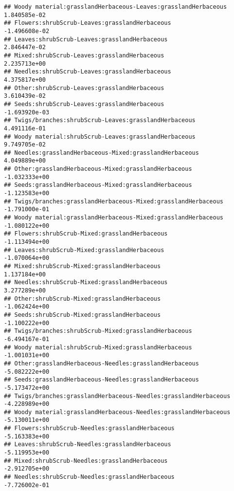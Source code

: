 \documentclass[
]{article}
\begin{document}
\begin{verbatim}
## Woody material:grasslandHerbaceous-Leaves:grasslandHerbaceous          1.840585e-02
## Flowers:shrubScrub-Leaves:grasslandHerbaceous                         -1.496608e-02
## Leaves:shrubScrub-Leaves:grasslandHerbaceous                           2.846447e-02
## Mixed:shrubScrub-Leaves:grasslandHerbaceous                            2.235713e+00
## Needles:shrubScrub-Leaves:grasslandHerbaceous                          4.375817e+00
## Other:shrubScrub-Leaves:grasslandHerbaceous                            3.610439e-02
## Seeds:shrubScrub-Leaves:grasslandHerbaceous                           -1.693920e-03
## Twigs/branches:shrubScrub-Leaves:grasslandHerbaceous                   4.491116e-01
## Woody material:shrubScrub-Leaves:grasslandHerbaceous                   9.749705e-02
## Needles:grasslandHerbaceous-Mixed:grasslandHerbaceous                  4.049889e+00
## Other:grasslandHerbaceous-Mixed:grasslandHerbaceous                   -1.032333e+00
## Seeds:grasslandHerbaceous-Mixed:grasslandHerbaceous                   -1.123583e+00
## Twigs/branches:grasslandHerbaceous-Mixed:grasslandHerbaceous          -1.791000e-01
## Woody material:grasslandHerbaceous-Mixed:grasslandHerbaceous          -1.080122e+00
## Flowers:shrubScrub-Mixed:grasslandHerbaceous                          -1.113494e+00
## Leaves:shrubScrub-Mixed:grasslandHerbaceous                           -1.070064e+00
## Mixed:shrubScrub-Mixed:grasslandHerbaceous                             1.137184e+00
## Needles:shrubScrub-Mixed:grasslandHerbaceous                           3.277289e+00
## Other:shrubScrub-Mixed:grasslandHerbaceous                            -1.062424e+00
## Seeds:shrubScrub-Mixed:grasslandHerbaceous                            -1.100222e+00
## Twigs/branches:shrubScrub-Mixed:grasslandHerbaceous                   -6.494167e-01
## Woody material:shrubScrub-Mixed:grasslandHerbaceous                   -1.001031e+00
## Other:grasslandHerbaceous-Needles:grasslandHerbaceous                 -5.082222e+00
## Seeds:grasslandHerbaceous-Needles:grasslandHerbaceous                 -5.173472e+00
## Twigs/branches:grasslandHerbaceous-Needles:grasslandHerbaceous        -4.228989e+00
## Woody material:grasslandHerbaceous-Needles:grasslandHerbaceous        -5.130011e+00
## Flowers:shrubScrub-Needles:grasslandHerbaceous                        -5.163383e+00
## Leaves:shrubScrub-Needles:grasslandHerbaceous                         -5.119953e+00
## Mixed:shrubScrub-Needles:grasslandHerbaceous                          -2.912705e+00
## Needles:shrubScrub-Needles:grasslandHerbaceous                        -7.726002e-01

\end{verbatim}
\end{document}
